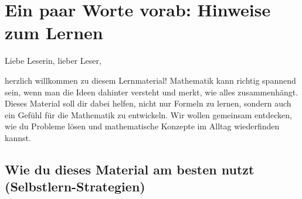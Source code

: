 \section{Ein paar Worte vorab: Hinweise zum Lernen} 

Liebe Leserin, lieber Leser,

herzlich willkommen zu diesem Lernmaterial! Mathematik kann richtig spannend sein, wenn man die Ideen dahinter versteht und merkt, wie alles zusammenhängt. Dieses Material soll dir dabei helfen, nicht nur Formeln zu lernen, sondern auch ein Gefühl für die Mathematik zu entwickeln. Wir wollen gemeinsam entdecken, wie du Probleme lösen und mathematische Konzepte im Alltag wiederfinden kannst.

\subsection*{Wie du dieses Material am besten nutzt (Selbstlern-Strategien)}

